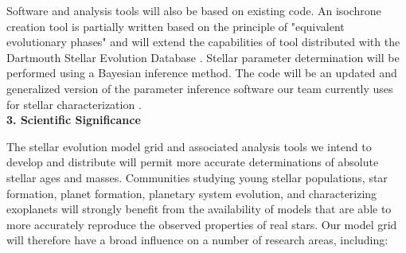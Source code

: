 Software and analysis tools will also be based on existing code. An isochrone creation tool is partially written based on the principle of "equivalent evolutionary phases" \citep{Bergbusch1992, Dotter2016} and will extend the capabilities of tool distributed with the Dartmouth Stellar Evolution Database \citep{Dotter2008}. Stellar parameter determination will be performed using a Bayesian inference method. The code will be an updated and generalized version of the parameter inference software our team currently uses for stellar characterization \citep{Mann2015, Mann2016}. \\


{\bf\large 3. Scientific Significance}  

The stellar evolution model grid and associated analysis tools we intend to develop and distribute will permit more accurate determinations of absolute stellar ages and masses. Communities studying young stellar populations, star formation, planet formation, planetary system evolution, and characterizing exoplanets will strongly benefit from the availability of models that are able to more accurately reproduce the observed properties of real stars. Our model grid will therefore have a broad influence on a number of research areas, including:
